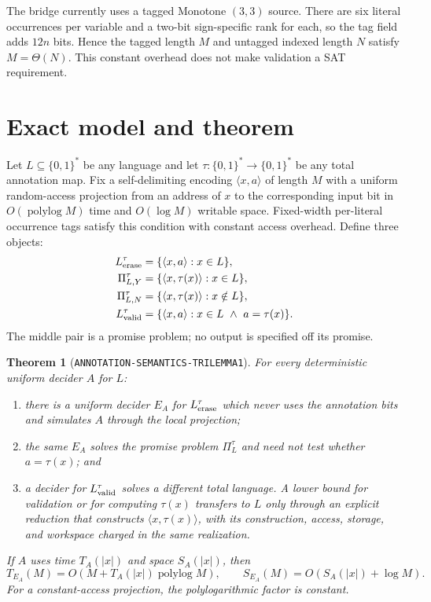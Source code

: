 \documentclass[11pt]{article}
\newtheorem{theorem}{Theorem}
\begin{document}
The bridge currently uses a tagged Monotone $(3,3)$ source.  There are six
literal occurrences per variable and a two-bit sign-specific rank for each,
so the tag field adds $12n$ bits.  Hence the tagged length $M$ and untagged
indexed length $N$ satisfy $M=\Theta(N)$.  This constant overhead does not
make validation a SAT requirement.

\section{Exact model and theorem}

Let $L\subseteq\{0,1\}^*$ be any language and let
$\tau:\{0,1\}^*\to\{0,1\}^*$ be any total annotation map.  Fix a
self-delimiting encoding $\langle x,a\rangle$ of length $M$ with a uniform
random-access projection from an address of $x$ to the corresponding input
bit in $O(\operatorname{polylog}M)$ time and $O(\log M)$ writable space.
Fixed-width per-literal occurrence tags satisfy this condition with constant
access overhead.  Define three objects:
\begin{align*}
 L_{\rm erase}^{\tau}
   &=\{\langle x,a\rangle:x\in L\},\\
 \Pi^{\tau}_{L,Y}
   &=\{\langle x,\tau(x)\rangle:x\in L\},\\
 \Pi^{\tau}_{L,N}
   &=\{\langle x,\tau(x)\rangle:x\notin L\},\\
 L_{\rm valid}^{\tau}
   &=\{\langle x,a\rangle:x\in L\ \wedge\ a=\tau(x)\}.
\end{align*}
The middle pair is a promise problem; no output is specified off its promise.

\begin{theorem}[\texttt{ANNOTATION-SEMANTICS-TRILEMMA1}]
For every deterministic uniform decider $A$ for $L$:
\begin{enumerate}[leftmargin=1.5em]
\item there is a uniform decider $E_A$ for $L_{\rm erase}^{\tau}$ which never
uses the annotation bits and simulates $A$ through the local projection;
\item the same $E_A$ solves the promise problem $\Pi_L^\tau$ and need not
test whether $a=\tau(x)$; and
\item a decider for $L_{\rm valid}^{\tau}$ solves a different total language.
A lower bound for validation or for computing $\tau(x)$ transfers to $L$
only through an explicit reduction that constructs
$\langle x,\tau(x)\rangle$, with its construction, access, storage, and
workspace charged in the same realization.
\end{enumerate}
If $A$ uses time $T_A(|x|)$ and space $S_A(|x|)$, then
\[
 T_{E_A}(M)=O\!\left(M+T_A(|x|)\operatorname{polylog}M\right),\qquad
 S_{E_A}(M)=O\!\left(S_A(|x|)+\log M\right).
\]
For a constant-access projection, the polylogarithmic factor is constant.
\end{theorem}
\end{document}
